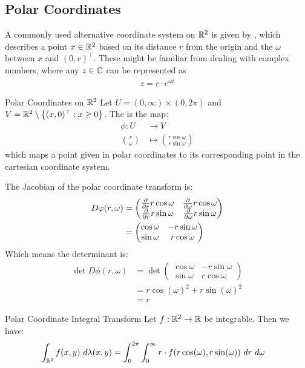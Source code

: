 \subsection{Polar Coordinates}
A commonly used alternative coordinate system on $\mathbb{R}^2$ is given by , which describes a point $x \in \mathbb{R}^2$ based on its distance $r$ from the origin and the  $\omega$ between $x$ and $(0,r)^\top$. These might be familiar from dealing with complex numbers, where any $z \in \mathbb{C}$ can be represented as
\begin{align*}
	z = r \cdot e^{\omega i}
\end{align*}
\begin{importantdefinition}{Polar Coordinates on $\mathbb{R}^2$}{}
	Let $U = (0, \infty) \times (0,2\pi)$ and $V = \mathbb{R}^2 \setminus \qty{(x,0)^\top : x \geq 0}$. The  is the map:
	\begin{align*}
		\phi : U &\to V\\
		\binom{r}{\omega} &\mapsto \binom{r \cos \omega}{r \sin \omega}
	\end{align*}
	which maps a point given in polar coordinates to its corresponding point in the cartesian coordinate system. 
\end{importantdefinition}
The Jacobian of the polar coordinate transform is:
\begin{align*}
	D\varphi(r,\omega)
	&=
	\begin{pmatrix}
		\pdv{r} r \cos \omega & \pdv{\omega} r \cos \omega\\
		\pdv{r} r \sin \omega & \pdv{\omega} r \sin \omega
	\end{pmatrix}
	\\
	&=
	\begin{pmatrix}
		\cos \omega & -r \sin \omega\\
		\sin \omega & r \cos \omega
	\end{pmatrix}
\end{align*}
Which means the determinant is:
\begin{align*}
	\det D\phi(r,\omega)
	&=
	\det 
	\begin{pmatrix}
		\cos \omega & -r \sin \omega\\
		\sin \omega & r \cos \omega
	\end{pmatrix}
	\\
	&=
	r\cos(\omega)^2 + r\sin(\omega)^2 
	\\
	&= r
\end{align*}
\begin{importantcorollary}{Polar Coordinate Integral Transform}{}
	Let $f : \mathbb{R}^2 \to \mathbb{R}$ be integrable. Then we have:
	\begin{align*}
		\int_{\mathbb{R}^2} f(x,y) ~d\lambda(x,y) 
		&=
		\int_{0}^{2\pi} \int_{0}^\infty r \cdot f(r \cos(\omega), r\sin(\omega)) ~dr ~d\omega
	\end{align*}
\end{importantcorollary}
